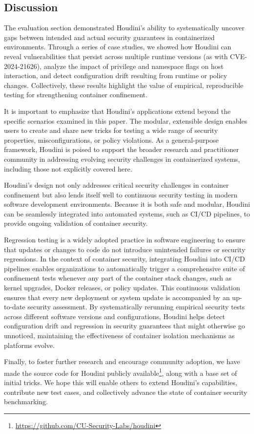 \documentclass[12pt]{report}
\begin{document}
\begin{doublespace}
\chapter{Discussion}
The evaluation section demonstrated Houdini's ability to systematically uncover gaps between intended and actual security guarantees in containerized environments. Through a series of case studies, we showed how Houdini can reveal vulnerabilities that persist across multiple runtime versions (as with CVE-2024-21626), analyze the impact of privilege and namespace flags on host interaction, and detect configuration drift resulting from runtime or policy changes. Collectively, these results highlight the value of empirical, reproducible testing for strengthening container confinement.

It is important to emphasize that Houdini's applications extend beyond the specific scenarios examined in this paper. The modular, extensible design enables users to create and share new tricks for testing a wide range of security properties, misconfigurations, or policy violations. As a general-purpose framework, Houdini is poised to support the broader research and practitioner community in addressing evolving security challenges in containerized systems, including those not explicitly covered here.

Houdini's design not only addresses critical security challenges in container confinement but also lends itself well to continuous security testing in modern software development environments. Because it is both safe and modular, Houdini can be seamlessly integrated into automated systems, such as CI/CD pipelines, to provide ongoing validation of container security.

Regression testing is a widely adopted practice in software engineering to ensure that updates or changes to code do not introduce unintended failures or security regressions. In the context of container security, integrating Houdini into CI/CD pipelines enables organizations to automatically trigger a comprehensive suite of confinement tests whenever any part of the container stack changes, such as kernel upgrades, Docker releases, or policy updates. This continuous validation ensures that every new deployment or system update is accompanied by an up-to-date security assessment. By systematically rerunning empirical security tests across different software versions and configurations, Houdini helps detect configuration drift and regression in security guarantees that might otherwise go unnoticed, maintaining the effectiveness of container isolation mechanisms as platforms evolve.

Finally, to foster further research and encourage community adoption, we have made the source code for Houdini publicly available\footnote{\url{https://github.com/CU-Security-Labs/houdini}}, along with a base set of initial tricks. We hope this will enable others to extend Houdini's capabilities, contribute new test cases, and collectively advance the state of container security benchmarking.

\end{doublespace} 
	
	
\end{document}

